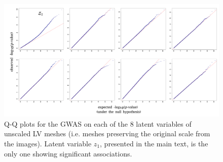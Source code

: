\documentclass[fleqn,10pt]{wlscirep}
\begin{document}
\begin{figure}
 \centering
 \includegraphics[width=\textwidth]{figs/supplementary/unscaled_qq.png}
 \caption{Q-Q plots for the GWAS on each of the 8 latent variables of unscaled LV meshes (i.e. meshes preserving the original scale from the images). Latent variable $z_1$, presented in the main text, is the only one showing significant associations.}
 \label{fig:qq_unscaled}
\end{figure}
\end{document}
